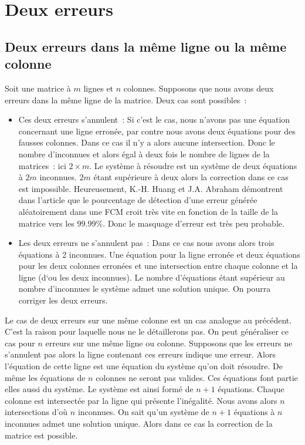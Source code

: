 \documentclass[a4paper,10pt]{report}
\begin{document}
\section{Deux erreurs}
\subsection{Deux erreurs dans la même ligne ou la même colonne}
Soit une matrice à $m$ lignes et $n$ colonnes. Supposons que nous avons deux erreurs dans la même ligne de la matrice. 
Deux cas sont possibles :
\begin{itemize}
 \item Ces deux erreurs s’annulent : Si c’est le cas, nous n’avons pas une équation concernant une ligne erronée, par 
       contre nous avons deux équations pour des fausses colonnes. Dans ce cas il n’y a alors aucune intersection. 
       Donc le nombre d’inconnues et alors égal à deux fois le nombre de lignes de la matrices : ici $2 \times m$.
       \newline
       Le système à résoudre est un système de deux équations à $2m$ inconnues. $2m$ étant supérieure à deux alors 
       la correction dans ce cas est impossible.\newline
       Heureusement, K.-H. Huang et J.A. Abraham démontrent dans l'article que le pourcentage de détection d'une erreur 
       générée  aléatoirement dans une FCM croit très vite en fonction de la taille de la matrice vers les $99.99\%$. 
       Donc le masquage d'erreur est très peu probable.  
 \item Les deux erreurs ne s’annulent pas : Dans ce cas nous avons alors trois équations à 2 inconnues. Une équation 
       pour la ligne erronée et deux équations pour les deux colonnes erronées et une intersection entre chaque colonne 
       et la ligne (d‘ou les deux inconnues). Le nombre d’équations étant supérieur au nombre d’inconnues le système admet 
       une solution unique. On pourra corriger les deux erreurs.
\end{itemize}
Le cas de deux erreurs sur une même colonne est un cas analogue au précédent. C’est la raison pour laquelle nous ne 
le détaillerons pas.\newline
On peut généraliser ce cas pour $n$ erreurs sur une même ligne ou colonne. Supposons que les erreurs ne s’annulent pas 
alors la ligne contenant ces erreurs indique une erreur. Alors l’équation de cette ligne est une équation du système 
qu’on doit résoudre. De même les équations de $n$ colonnes ne seront pas valides. Ces équations font partie elles aussi 
du système. Le système est ainsi formé de $n+1$ équations. Chaque colonne est intersectée par la ligne qui présente l’inégalité. 
Nous avons alors $n$ intersections d’où $n$ inconnues.\newline
On sait qu'un système de $n+1$ équations à $n$ inconnues admet une solution unique. Alors dans ce cas la correction de 
la matrice est possible.
\end{document}
